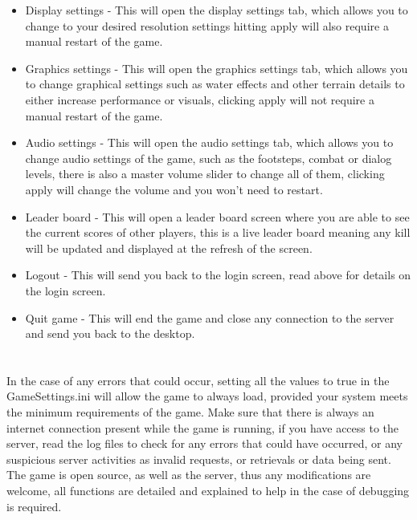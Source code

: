 \documentclass[letterpaper]{article}
\begin{document}
\begin{enumerate}
		\begin{itemize}
			\item Display settings - This will open the display settings tab, which allows you to change to your desired resolution settings hitting apply will also require a manual restart of the game. \\ 
			\item Graphics settings - This will open the graphics settings tab, which allows you to change graphical settings such as water effects and other terrain details to either increase performance or visuals, clicking apply will not require a manual restart of the game. \\
			\item Audio settings - This will open the audio settings tab, which allows you to change audio settings of the game, such as the footsteps, combat or dialog levels, there is also a master volume slider to change all of them, clicking apply will change the volume and you won't need to restart. \\
			\item Leader board - This will open a leader board screen where you are able to see the current scores of other players, this is a live leader board meaning any kill will be updated and displayed at the refresh of the screen. \\
			\item Logout - This will send you back to the login screen, read above for details on the login screen. \\
			\item Quit game - This will end the game and close any connection to the server and send you back to the desktop. \\
		\end{itemize}		   
	\end{enumerate}
		\section*{\colorbox{black}{}} 
	\vspace{0.1in}
	In the case of any errors that could occur, setting all the values to true in the GameSettings.ini will allow the game to always load, provided your system meets the minimum requirements of the game. Make sure that there is always an internet connection present while the game is running, if you have access to the server, read the log files to check for any errors that could have occurred, or any suspicious server activities as invalid requests, or retrievals or data being sent. The game is open source, as well as the server, thus any modifications are welcome, all functions are detailed and explained to help in the case of debugging is required.  
	

\end{document}
